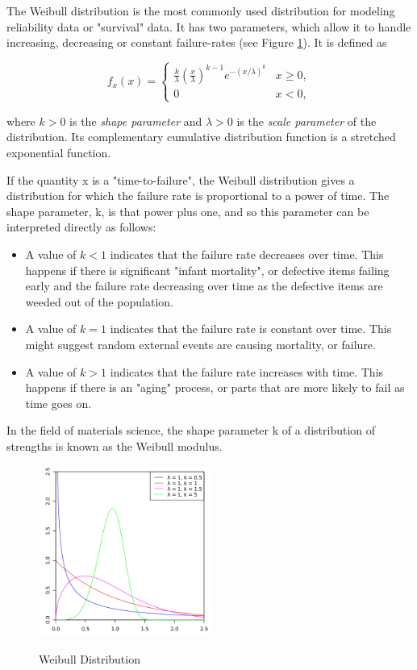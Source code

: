 The Weibull distribution is the most commonly used distribution for modeling reliability data or "survival" data. It has two parameters, which allow it to handle increasing, decreasing or constant failure-rates (see Figure \ref{fig:weibull}).
It is defined as

\begin{equation}\label{eq_weibull}
f_x (x) =
  \begin{cases}
    \frac{k}{\lambda}\left(\frac{x}{\lambda}\right)^{k-1}e^{-(x/\lambda)^{k}} & x\geq0 ,\\
    0 & x<0 ,
    \end{cases}
\end{equation}

where $k > 0$ is the \emph{shape parameter }and $\lambda > 0$ is the \emph{scale parameter }of the distribution. Its complementary cumulative distribution function is a stretched exponential function.

If the quantity x is a "time-to-failure", the Weibull distribution gives a distribution for which the failure rate is proportional to a power of time. The shape parameter, k, is that power plus one, and so this parameter can be interpreted directly as follows:

\begin{itemize}
  \item  A value of $k < 1$ indicates that the failure rate decreases over time. This happens if there is significant "infant mortality", or defective items failing early and the failure rate decreasing over time as the defective items are weeded out of the population.

  \item  A value of $k = 1$ indicates that the failure rate is constant over time. This might suggest random external events are causing mortality, or failure.
  \item  A value of $k > 1$ indicates that the failure rate increases with time. This happens if there is an "aging" process, or parts that are more likely to fail as time goes on.
\end{itemize}

In the field of materials science, the shape parameter k of a distribution of strengths is known as the Weibull modulus.

\begin{figure}
  \centering
  \includegraphics[width=0.5\textwidth]{../Images/Weibull_PDF.png}\\
  \caption{Weibull Distribution}\label{fig:weibull}
\end{figure}


